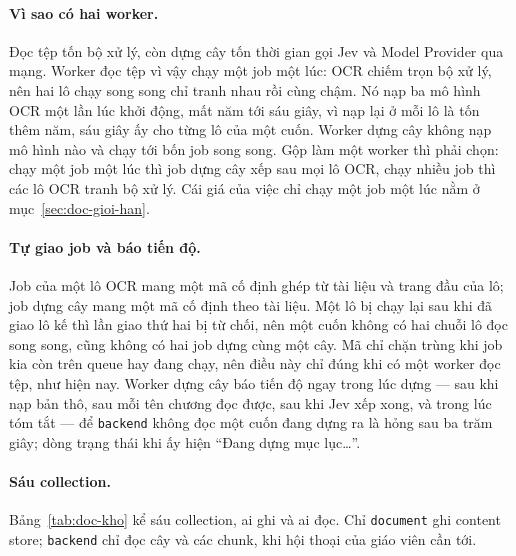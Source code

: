 \paragraph{Vì sao có hai worker.} Đọc tệp tốn bộ xử lý, còn dựng cây tốn thời gian gọi Jev và Model
Provider qua mạng. Worker đọc tệp vì vậy chạy một job một lúc: OCR chiếm trọn bộ xử lý, nên hai lô
chạy song song chỉ tranh nhau rồi cùng chậm. Nó nạp ba mô hình OCR một lần lúc khởi động, mất năm
tới sáu giây, vì nạp lại ở mỗi lô là tốn thêm năm, sáu giây ấy cho từng lô của một cuốn. Worker dựng
cây không nạp mô hình nào và chạy tới bốn job song song. Gộp làm một worker thì phải chọn: chạy một
job một lúc thì job dựng cây xếp sau mọi lô OCR, chạy nhiều job thì các lô OCR tranh bộ xử lý. Cái
giá của việc chỉ chạy một job một lúc nằm ở mục~\ref{sec:doc-gioi-han}.

\paragraph{Tự giao job và báo tiến độ.} Job của một lô OCR mang một mã cố định ghép từ tài liệu và
trang đầu của lô; job dựng cây mang một mã cố định theo tài liệu. Một lô bị chạy lại sau khi đã giao
lô kế thì lần giao thứ hai bị từ chối, nên một cuốn không có hai chuỗi lô đọc song song, cũng không
có hai job dựng cùng một cây. Mã chỉ chặn trùng khi job kia còn trên queue hay đang chạy, nên điều
này chỉ đúng khi có một worker đọc tệp, như hiện nay. Worker dựng cây báo tiến độ ngay trong lúc
dựng --- sau khi nạp bản thô, sau mỗi tên chương đọc được, sau khi Jev xếp xong, và trong lúc tóm
tắt --- để \texttt{backend} không đọc một cuốn đang dựng ra là hỏng sau ba trăm giây; dòng trạng
thái khi ấy hiện ``Đang dựng mục lục\ldots''.

\paragraph{Sáu collection.} Bảng~\ref{tab:doc-kho} kể sáu collection, ai ghi và ai đọc. Chỉ
\texttt{document} ghi content store; \texttt{backend} chỉ đọc cây và các chunk, khi hội thoại của
giáo viên cần tới.

